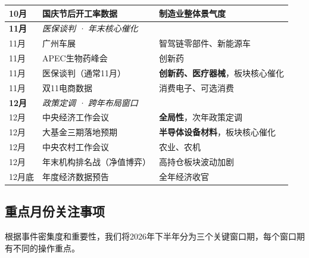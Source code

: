 \begin{exhibitbox}[表9-32：2026年下半年财报与行业重点事件日历]
\begin{tabularx}{\textwidth}{l X l}
\rowcolor{riskamber!5}
10月 & 国庆节后开工率数据 & 制造业整体景气度 \\
\midrule
\rowcolor{riskred!5}
\textbf{11月} & \multicolumn{2}{l}{\textit{医保谈判 · 年末核心催化}} \\
\rowcolor{riskred!5}
11月 & 广州车展 & 智驾链零部件、新能源车 \\
\rowcolor{riskred!5}
11月 & APEC生物药峰会 & 创新药 \\
\rowcolor{riskred!5}
11月 & 医保谈判（通常11月） & \textbf{创新药、医疗器械}，板块核心催化 \\
\rowcolor{riskred!5}
11月 & 双11电商数据 & 消费电子、可选消费 \\
\midrule
\rowcolor{nvgreen!5}
\textbf{12月} & \multicolumn{2}{l}{\textit{政策定调 · 跨年布局窗口}} \\
\rowcolor{nvgreen!5}
12月 & 中央经济工作会议 & \textbf{全局性}，次年政策定调 \\
\rowcolor{nvgreen!5}
12月 & 大基金三期落地预期 & \textbf{半导体设备材料}，板块核心催化 \\
\rowcolor{nvgreen!5}
12月 & 中央农村工作会议 & 农业、农机 \\
\rowcolor{nvgreen!5}
12月 & 年末机构排名战（净值博弈） & 高持仓板块波动加剧 \\
\rowcolor{nvgreen!5}
12月底 & 年度经济数据预告 & 全年经济收官 \\
\bottomrule
\end{tabularx}
\end{exhibitbox}

\subsection{重点月份关注事项}

根据事件密集度和重要性，我们将2026年下半年分为三个关键窗口期，每个窗口期有不同的操作重点。

